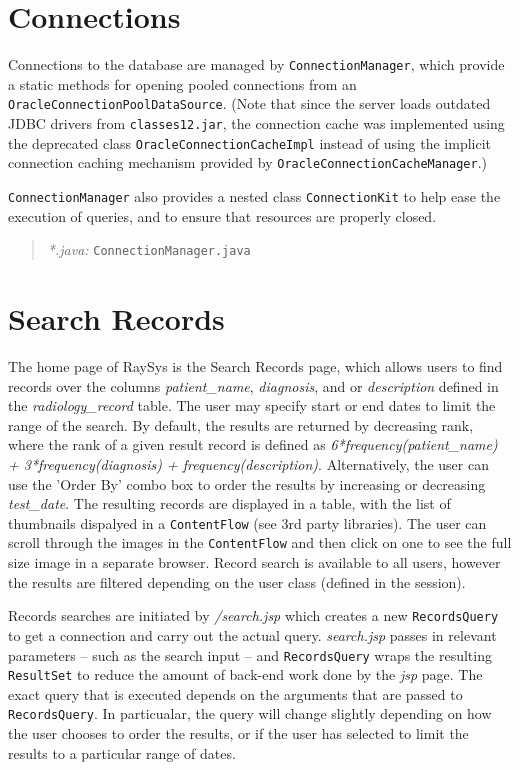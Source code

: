 \documentclass[12pt]{report}
\begin{document}
\section*{Connections}
Connections to the database are managed by \texttt{ConnectionManager}, which provide a static methods for opening pooled connections from an \texttt{OracleConnectionPoolDataSource}. (Note that since the server loads outdated JDBC drivers from \texttt{classes12.jar}, the connection cache was implemented using the deprecated class \texttt{OracleConnectionCacheImpl} instead of using the implicit connection caching mechanism provided by \texttt{OracleConnectionCacheManager}.)

\texttt{ConnectionManager} also provides a nested class \texttt{ConnectionKit} to help ease the execution of queries, and to ensure that resources are properly closed.

\begin{quote}
\emph{*.java: } \texttt{ConnectionManager.java}\\
\end{quote}
\section*{Search Records}
The home page of RaySys is the Search Records page, which allows users to find records over the columns \emph{patient\_name}, \emph{diagnosis}, and or \emph{description} defined in the \emph{radiology\_record} table. The user may specify start or end dates to limit the range of the search. By default, the results are returned by decreasing rank, where the rank of a given result record is defined as \emph{6*frequency(patient\_name) + 3*frequency(diagnosis) + frequency(description)}. Alternatively, the user can use the 'Order By' combo box to order the results by increasing or decreasing \emph{test\_date}. The resulting records are displayed in a table, with the list of thumbnails dispalyed in a \texttt{ContentFlow} (see 3rd party libraries). The user can scroll through the images in the \texttt{ContentFlow} and then click on one to see the full size image in a separate browser. Record search is available to all users, however the results are filtered depending on the user class (defined in the session).

Records searches are initiated by \emph{/search.jsp} which creates a new \texttt{RecordsQuery} to get a connection and carry out the actual query. \emph{search.jsp} passes in relevant parameters -- such as the search input -- and \texttt{RecordsQuery} wraps the resulting \texttt{ResultSet} to reduce the amount of back-end work done by the \emph{jsp} page. The exact query that is executed depends on the arguments that are passed to \texttt{RecordsQuery}. In particualar, the query will change slightly depending on how the user chooses to order the results, or if the user has selected to limit the results to a particular range of dates.
\end{document}
